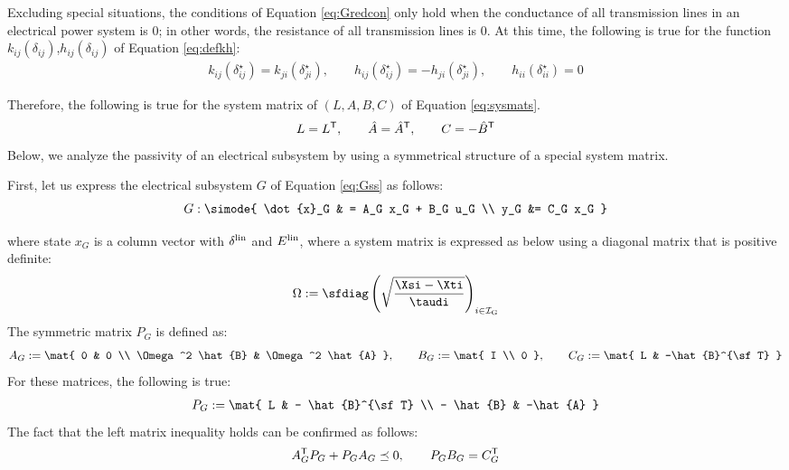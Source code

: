 \documentclass[graybox, envcountchap]{svmult}
\begin{document}
Excluding special situations, the conditions of Equation \ref{eq:Gredcon} only hold when the conductance of all transmission lines in an electrical power system is 0; in other words, the resistance of all transmission lines is 0.
At this time, the following is true for the function $k_{ij}(\delta_{ij})$,$h_{ij}(\delta_{ij})$ of Equation \ref{eq:defkh}:
\begin{align*}
k_{ij}(\delta_{ij}^{\star}) =
k_{ji}(\delta_{ji}^{\star})
,\qquad
h_{ij}(\delta_{ij}^{\star}) = 
- h_{ji}(\delta_{ji}^{\star}),\qquad
h_{ii}(\delta_{ii}^{\star}) = 0
\end{align*}

Therefore, the following is true for the system matrix of $(L,A,B,C)$ of Equation \ref{eq:sysmats}.
\begin{align}\label{eq:sysmatst}
L=L^{\sf T} ,\qquad
\hat{A} = \hat{A}^{\sf T},\qquad
C= -\hat{B}^{\sf T}
\end{align}
Below, we analyze the passivity of an electrical subsystem by using a symmetrical structure of a special system matrix. 

First, let us express the electrical subsystem $G$ of Equation \ref{eq:Gss} as follows:
\begin{align}
G: \simode{
\dot{x}_G & = A_G x_G + B_G u_G \\
y_G &= C_G x_G
}
\end{align}

where state $x_G$ is a column vector with ${\delta}^{\rm lin}$ and $ E^{\rm lin} $,
where a system matrix is expressed as below using a diagonal matrix that is positive definite:
\[
 \Omega :=
\sfdiag \left( \sqrt{\frac{ \Xsi - \Xti }{ \taudi } } \right)_{i \in \mathcal{I}_{\rm G} }
\]
The symmetric matrix $P_G$ is defined as:
\[
A_G := 
\mat{
0 & 0 \\
 \Omega^2 \hat{B}   &  \Omega^2 \hat{A} 
},\qquad
B_G := 
\mat{
I \\
0
},\qquad
C_G := 
\mat{
L & -\hat{B}^{\sf T}
}
\]
For these matrices, the following is true:
\begin{align}\label{eq:defPG}
P_G := 
\mat{
L  &  - \hat{B}^{\sf T} \\
- \hat{B} & -\hat{A}
}
\end{align}
The fact that the left matrix inequality holds can be confirmed as follows:
\begin{align}\label{eq:lyapinG}
A^{\sf T}_G P_G + P_G A_G \preceq 
0
,\qquad
P_G B_G = C_G^{\sf T}
\end{align}
\end{document}
